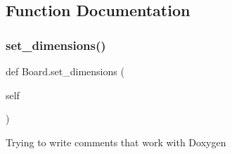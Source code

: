 \subsection{Function Documentation}
\mbox{\label{namespace_board_ab67f816560ee2b4c90117d8d4e0507b5}} 
\subsubsection{\texorpdfstring{set\+\_\+dimensions()}{set\_dimensions()}}
{\footnotesize\ttfamily def Board.\+set\+\_\+dimensions (\begin{DoxyParamCaption}\item[{}]{self }\end{DoxyParamCaption})}

\begin{DoxyVerb}Trying to write comments that work with Doxygen
\end{DoxyVerb}
 